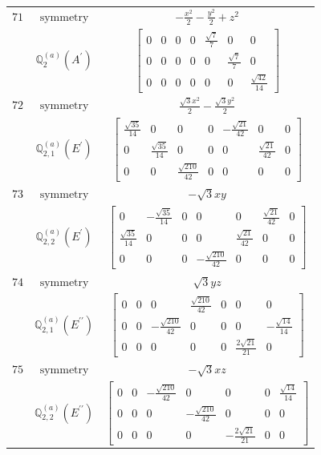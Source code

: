 \documentclass[fleqn,8pt,landscape]{jsarticle}
\begin{document}
\begin{longtable}{ccc}
$ 71 $ & $ \text{symmetry} $ & $ - \frac{x^{2}}{2} - \frac{y^{2}}{2} + z^{2} $ \\
$  $ & $ \mathbb{Q}_{2}^{(a)}(A^{\prime}) $ & $ \begin{bmatrix} 0 & 0 & 0 & 0 & \frac{\sqrt{7}}{7} & 0 & 0 \\ 0 & 0 & 0 & 0 & 0 & \frac{\sqrt{7}}{7} & 0 \\ 0 & 0 & 0 & 0 & 0 & 0 & \frac{\sqrt{42}}{14} \end{bmatrix} $ \\ \hline
$ 72 $ & $ \text{symmetry} $ & $ \frac{\sqrt{3} x^{2}}{2} - \frac{\sqrt{3} y^{2}}{2} $ \\
$  $ & $ \mathbb{Q}_{2,1}^{(a)}(E^{\prime}) $ & $ \begin{bmatrix} \frac{\sqrt{35}}{14} & 0 & 0 & 0 & - \frac{\sqrt{21}}{42} & 0 & 0 \\ 0 & \frac{\sqrt{35}}{14} & 0 & 0 & 0 & \frac{\sqrt{21}}{42} & 0 \\ 0 & 0 & \frac{\sqrt{210}}{42} & 0 & 0 & 0 & 0 \end{bmatrix} $ \\ \hline
$ 73 $ & $ \text{symmetry} $ & $ - \sqrt{3} x y $ \\
$  $ & $ \mathbb{Q}_{2,2}^{(a)}(E^{\prime}) $ & $ \begin{bmatrix} 0 & - \frac{\sqrt{35}}{14} & 0 & 0 & 0 & \frac{\sqrt{21}}{42} & 0 \\ \frac{\sqrt{35}}{14} & 0 & 0 & 0 & \frac{\sqrt{21}}{42} & 0 & 0 \\ 0 & 0 & 0 & - \frac{\sqrt{210}}{42} & 0 & 0 & 0 \end{bmatrix} $ \\ \hline
$ 74 $ & $ \text{symmetry} $ & $ \sqrt{3} y z $ \\
$  $ & $ \mathbb{Q}_{2,1}^{(a)}(E^{\prime\prime}) $ & $ \begin{bmatrix} 0 & 0 & 0 & \frac{\sqrt{210}}{42} & 0 & 0 & 0 \\ 0 & 0 & - \frac{\sqrt{210}}{42} & 0 & 0 & 0 & - \frac{\sqrt{14}}{14} \\ 0 & 0 & 0 & 0 & 0 & \frac{2 \sqrt{21}}{21} & 0 \end{bmatrix} $ \\ \hline
$ 75 $ & $ \text{symmetry} $ & $ - \sqrt{3} x z $ \\
$  $ & $ \mathbb{Q}_{2,2}^{(a)}(E^{\prime\prime}) $ & $ \begin{bmatrix} 0 & 0 & - \frac{\sqrt{210}}{42} & 0 & 0 & 0 & \frac{\sqrt{14}}{14} \\ 0 & 0 & 0 & - \frac{\sqrt{210}}{42} & 0 & 0 & 0 \\ 0 & 0 & 0 & 0 & - \frac{2 \sqrt{21}}{21} & 0 & 0 \end{bmatrix} $ \\ \hline

\end{longtable}
\end{document}
